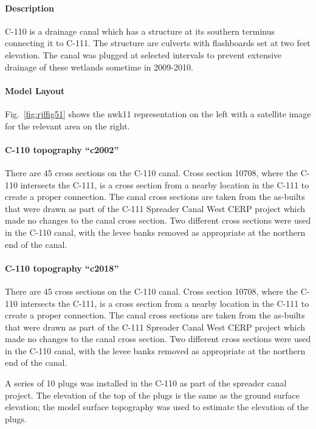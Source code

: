 \paragraph{Description}
C-110 is a drainage canal which has a structure at its southern terminus connecting it to C-111. The structure are culverts with flashboards set at two feet elevation. The canal was plugged at selected intervals to prevent extensive drainage of these wetlands sometime in 2009-2010.

\paragraph{Model Layout}
Fig.~\ref{fig:rjffig51} shows the nwk11 representation on the left with a satellite image for the relevant area on the right.


\paragraph{C-110 topography ``c2002''}
There are 45 cross sections on the C-110 canal.  Cross section 10708, where the C-110 intersects the C-111, is a cross section from a nearby location in the C-111 to create a proper connection.    The canal cross sections are taken from the as-builts that were drawn as part of the C-111 Spreader Canal West CERP project which made no changes to the canal cross section\citep{USACE2011C111Spreader}.  Two different cross sections were used in the C-110 canal, with the levee banks removed as appropriate at the northern end of the canal.

\paragraph{C-110 topography ``c2018''}
There are 45 cross sections on the C-110 canal.  Cross section 10708, where the C-110 intersects the C-111, is a cross section from a nearby location in the C-111 to create a proper connection.    The canal cross sections are taken from the as-builts that were drawn as part of the C-111 Spreader Canal West CERP project which made no changes to the canal cross section\citep{USACE2011C111Spreader}.  Two different cross sections were used in the C-110 canal, with the levee banks removed as appropriate at the northern end of the canal.

A series of 10 plugs was installed in the C-110 as part of the spreader canal project.  The elevation of the top of the plugs is the same as the ground surface elevation; the model surface topography was used to estimate the elevation of the plugs\citep{USACE2011C111Spreader}.

